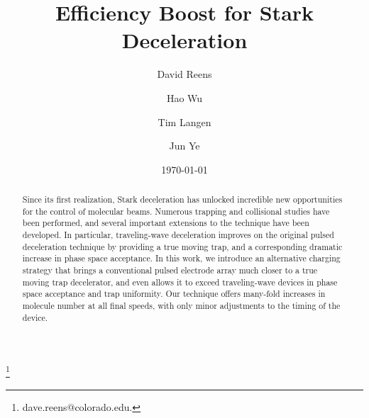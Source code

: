 \documentclass[%
 reprint,
 amsmath,amssymb,
 aps,
prl,
]{revtex4-1}
\begin{document}
\title{Efficiency Boost for Stark Deceleration}%

\author{David Reens}
\thanks{dave.reens@colorado.edu.}

\author{Hao Wu}

\author{Tim Langen}%

\author{Jun Ye}


\date{\today}



\begin{abstract}
Since its first realization, Stark deceleration has unlocked incredible new opportunities for the control of molecular beams. 
Numerous trapping and collisional studies have been performed, and several important extensions to the technique have been developed. 
In particular, traveling-wave deceleration improves on the original pulsed deceleration technique by providing a true moving trap, and a corresponding dramatic increase in phase space acceptance.
In this work, we introduce an alternative charging strategy that brings a conventional pulsed electrode array much closer to a true moving trap decelerator, and even allows it to exceed traveling-wave devices in phase space acceptance and trap uniformity.
Our technique offers many-fold increases in molecule number at all final speeds, with only minor adjustments to the timing of the device.
\end{abstract}

\maketitle
\end{document}
